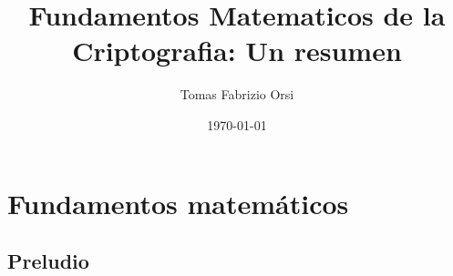 \documentclass[12pt,a4paper]{report}
\title{Fundamentos Matematicos de la Criptografia: Un resumen}
\author{Tomas Fabrizio Orsi}
\date{\today}
\begin{document}
\maketitle
\tableofcontents

\newcommand{\li}[1]{\ensuremath{\mathcal{{#1}}}}
\newcommand{\mat}[1]{\ensuremath{\mathbb{{#1}}}}
\newcommand{\rarrow}{\rightarrow}
\newcommand{\darrow}{\downarrow}
\newcommand{\xor}{\oplus}
\newcommand{\claude}{Claude ``La Cabra'' Shannon }
\newcommand{\alicebob}{
\begin{center}
\begin{tikzpicture}
  \node[draw, rectangle] (encript) at (0,0) {$\li{E}$};
  \node[draw, rectangle] (decript) at (4,0) {$\li{D}$};

  \node[draw, rectangle] (alice) at (0,1) {$\text{Alice}$};
  \node[draw, rectangle] (bob) at (4,1) {$\text{Bob}$};
  \node[draw, rectangle] (eve) at (2, -0.75) {$\text{Eve}$};

  \draw[->, thick] (encript) -- node[above] {c} (decript);

  \node[draw=none, rectangle] (mensajeEntrada) at (-2,0) {m};
  \draw[->, thick] (mensajeEntrada.east) -- (encript.west);

  \node[draw=none, rectangle] (mensajeSalida) at (6,0) {m};
  \draw[->, thick] (decript.east) -- (mensajeSalida.west);

  \draw[->, thick] (alice.south) -- node[right] {k} (encript.north);
  \draw[->, thick] (bob.south) -- node[right] {k} (decript.north);

  \draw[->, thick] (eve.north) -- (2, 0);

\end{tikzpicture}
\end{center}
}
\newcommand{\esquema}{$(\li{P}, \li{C}, \li{K}, \li{E}, \li{D}, \li{R})$ }

\newcommand{\divides}{\mid}
\newcommand{\ndivides}{\nmid}
\newcommand{\modulo}[1]{\; \bmod \; {{#1}}}
\newcommand{\cuerpo}[1][n]{\ensuremath{\sfrac{\li{Z}}{#1 \li{Z}}}}
\newcommand{\divent}{\backslash}
\newcommand{\orden}[1]{\ensuremath{\text{ord}({#1})}}


\part{Fundamentos matemáticos}

\chapter{Preludio}
\end{document}
